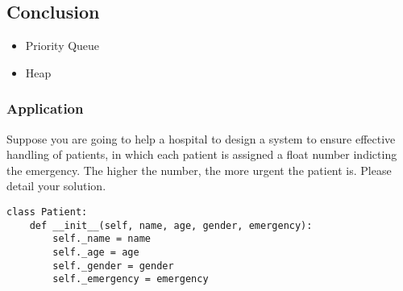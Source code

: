 \documentclass[aspectratio=169, 14pt]{beamer}
\begin{document}
\begin{frame}

	\section{\textcolor{darkmidnightblue}{Conclusion}}
	\begin{itemize}
		\item Priority Queue
		\item Heap
	\end{itemize}
\end{frame}

\begin{frame}[fragile]
	\frametitle{Application}
	Suppose you are going to help a hospital to design a system to ensure effective handling of patients, in which each patient is assigned a float number indicting the emergency. The higher the number, the more urgent the patient is. Please detail your solution.

	\begin{verbatim}
class Patient:
    def __init__(self, name, age, gender, emergency):
        self._name = name
        self._age = age
        self._gender = gender
        self._emergency = emergency
\end{verbatim}

\end{frame}
\end{document}
